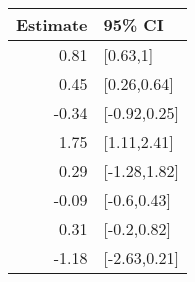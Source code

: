\begin{tabular}{rl}
  \hline
Estimate & 95\% CI \\ 
  \hline
0.81 & [0.63,1] \\ 
  0.45 & [0.26,0.64] \\ 
  -0.34 & [-0.92,0.25] \\ 
  1.75 & [1.11,2.41] \\ 
  0.29 & [-1.28,1.82] \\ 
  -0.09 & [-0.6,0.43] \\ 
  0.31 & [-0.2,0.82] \\ 
  -1.18 & [-2.63,0.21] \\ 
   \hline
\end{tabular}

